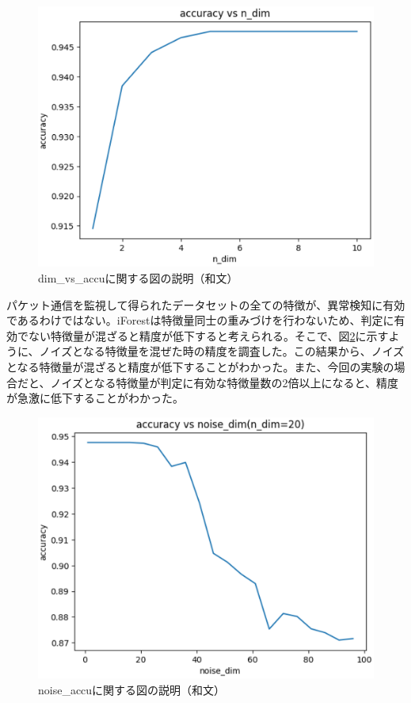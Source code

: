 \documentclass{css}
\begin{document}
\begin{figure}[tb]
    \centering
    \includegraphics[width=\linewidth]{pictures/eps/dim_vs_accu.eps}
    \caption{dim\_vs\_accuに関する図の説明（和文）}
    \label{fig:dim_vs_accu}
\end{figure}

パケット通信を監視して得られたデータセットの全ての特徴が、異常検知に有効であるわけではない。iForestは特徴量同士の重みづけを行わないため、判定に有効でない特徴量が混ざると精度が低下すると考えられる。そこで、図\ref{fig:noise_accu}に示すように、ノイズとなる特徴量を混ぜた時の精度を調査した。この結果から、ノイズとなる特徴量が混ざると精度が低下することがわかった。また、今回の実験の場合だと、ノイズとなる特徴量が判定に有効な特徴量数の2倍以上になると、精度が急激に低下することがわかった。

\begin{figure}[tb]
    \centering
    \includegraphics[width=\linewidth]{pictures/eps/noise_accu.eps}
    \caption{noise\_accuに関する図の説明（和文）}
    \label{fig:noise_accu}
\end{figure}
\end{document}

